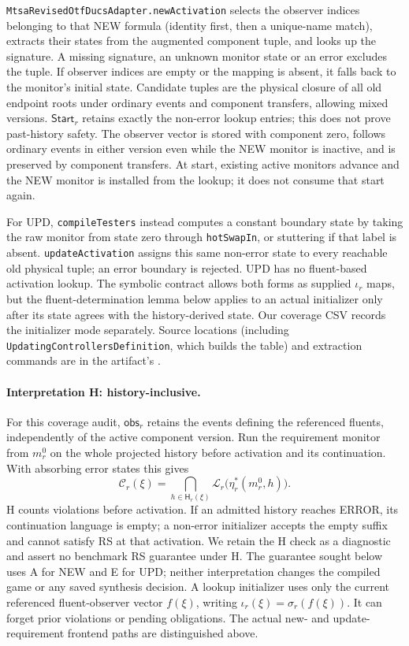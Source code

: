 \documentclass[11pt]{article}
\begin{document}
\texttt{MtsaRevisedOtfDucsAdapter.newActivation} selects the observer indices belonging to that NEW formula (identity first, then a unique-name match), extracts their states from the augmented component tuple, and looks up the signature. A missing signature, an unknown monitor state or an error excludes the tuple. If observer indices are empty or the mapping is absent, it falls back to the monitor's initial state. Candidate tuples are the physical closure of all old endpoint roots under ordinary events and component transfers, allowing mixed versions. $\mathsf{Start}_r$ retains exactly the non-error lookup entries; this does not prove past-history safety. The observer vector is stored with component zero, follows ordinary events in either version even while the NEW monitor is inactive, and is preserved by component transfers. At start, existing active monitors advance and the NEW monitor is installed from the lookup; it does not consume that start again.

For UPD, \texttt{compileTesters} instead computes a constant boundary state by taking the raw monitor from state zero through \texttt{hotSwapIn}, or stuttering if that label is absent. \texttt{updateActivation} assigns this same non-error state to every reachable old physical tuple; an error boundary is rejected. UPD has no fluent-based activation lookup. The symbolic contract allows both forms as supplied $\iota_r$ maps, but the fluent-determination lemma below applies to an actual initializer only after its state agrees with the history-derived state. Our coverage CSV records the initializer mode separately. Source locations (including \texttt{UpdatingControllersDefinition}, which builds the table) and extraction commands are in the artifact's .

\paragraph{Interpretation H: history-inclusive.}
For this coverage audit, $\mathsf{obs}_r$ retains the events defining the referenced fluents, independently of the active component version. Run the requirement monitor from $m_r^0$ on the whole projected history before activation and its continuation. With absorbing error states this gives
\[
 \mathcal C_r(\xi)=\bigcap_{h\in\mathsf H_r(\xi)}
 \mathcal L_r\bigl(\eta_r^*(m_r^0,h)\bigr).
\]
H counts violations before activation. If an admitted history reaches ERROR, its continuation language is empty; a non-error initializer accepts the empty suffix and cannot satisfy RS at that activation. We retain the H check as a diagnostic and assert no benchmark RS guarantee under H. The guarantee sought below uses A for NEW and E for UPD; neither interpretation changes the compiled game or any saved synthesis decision. A lookup initializer uses only the current referenced fluent-observer vector $f(\xi)$, writing $\iota_r(\xi)=\sigma_r(f(\xi))$. It can forget prior violations or pending obligations. The actual new- and update-requirement frontend paths are distinguished above.
\end{document}

